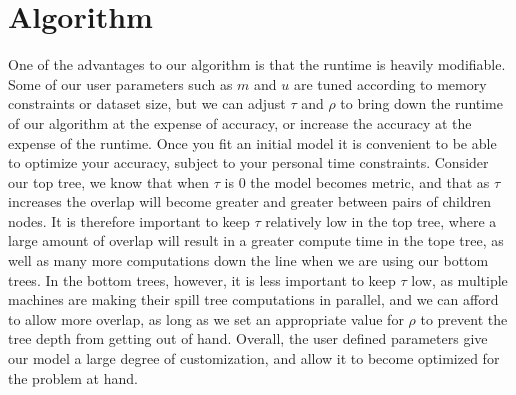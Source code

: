 \section{Algorithm}




One of the advantages to our algorithm is that the runtime is heavily 
modifiable.  Some of our user parameters such as $m$ and $u$ are tuned according
to memory constraints or dataset size, but we can adjust $\tau$ and $\rho$ to 
bring down the runtime of our algorithm at the expense of accuracy, or increase 
the accuracy at the expense of the runtime.  Once you fit an initial model it is 
convenient to be able to optimize your accuracy, subject to your personal time 
constraints.  Consider our top tree, we know that when $\tau$ is 0 the model 
becomes metric, and that as $\tau$ increases the overlap will become greater and 
greater between pairs of children nodes.  It is therefore important to keep 
$\tau$ relatively low in the top tree, where a large amount of overlap will 
result in a greater compute time in the tope tree, as well as many more 
computations down the line when we are using our bottom trees.  In the bottom 
trees, however, it is less important to keep $\tau$ low, as multiple machines 
are making their spill tree computations in parallel, and we can afford to allow 
more overlap, as long as we set an appropriate value for $\rho$ to prevent the 
tree depth from getting out of hand.  Overall, the user defined parameters give 
our model a large degree of customization, and allow it to become optimized for 
the problem at hand.